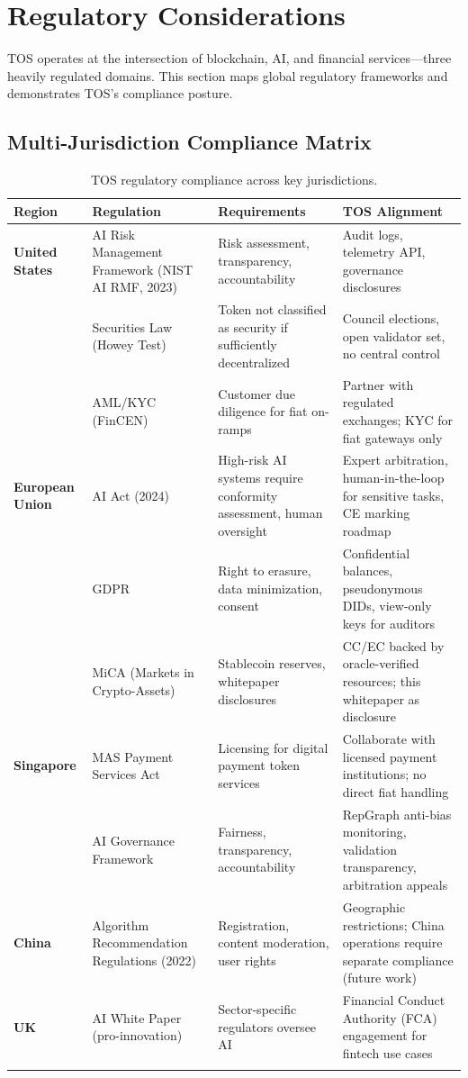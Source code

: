 \documentclass[11pt]{article}
\begin{document}
\section{Regulatory Considerations}
\label{sec:regulatory}

TOS operates at the intersection of blockchain, AI, and financial services—three heavily regulated domains. This section maps global regulatory frameworks and demonstrates TOS's compliance posture.

\subsection{Multi-Jurisdiction Compliance Matrix}

\begin{longtable}{@{}p{}p{}p{}p{}@{}}
\toprule
\textbf{Region} & \textbf{Regulation} & \textbf{Requirements} & \textbf{TOS Alignment} \\\midrule
\textbf{United States} & AI Risk Management Framework (NIST AI RMF, 2023) & Risk assessment, transparency, accountability & Audit logs, telemetry API, governance disclosures \\
 & Securities Law (Howey Test) & Token not classified as security if sufficiently decentralized & Council elections, open validator set, no central control \\
 & AML/KYC (FinCEN) & Customer due diligence for fiat on-ramps & Partner with regulated exchanges; KYC for fiat gateways only \\
\textbf{European Union} & AI Act (2024) & High-risk AI systems require conformity assessment, human oversight & Expert arbitration, human-in-the-loop for sensitive tasks, CE marking roadmap \\
 & GDPR & Right to erasure, data minimization, consent & Confidential balances, pseudonymous DIDs, view-only keys for auditors \\
 & MiCA (Markets in Crypto-Assets) & Stablecoin reserves, whitepaper disclosures & CC/EC backed by oracle-verified resources; this whitepaper as disclosure \\
\textbf{Singapore} & MAS Payment Services Act & Licensing for digital payment token services & Collaborate with licensed payment institutions; no direct fiat handling \\
 & AI Governance Framework & Fairness, transparency, accountability & RepGraph anti-bias monitoring, validation transparency, arbitration appeals \\
\textbf{China} & Algorithm Recommendation Regulations (2022) & Registration, content moderation, user rights & Geographic restrictions; China operations require separate compliance (future work) \\
\textbf{UK} & AI White Paper (pro-innovation) & Sector-specific regulators oversee AI & Financial Conduct Authority (FCA) engagement for fintech use cases \\
\bottomrule
\caption{TOS regulatory compliance across key jurisdictions.}
\end{longtable}
\end{document}
